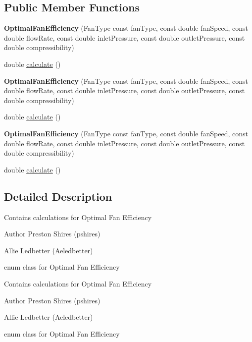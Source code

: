 \subsection*{Public Member Functions}
\begin{DoxyCompactItemize}
\item 
\mbox{\label{class_optimal_fan_efficiency_aff5850e4b0f6831e6d14436c138a723d}} 
{\bfseries Optimal\+Fan\+Efficiency} (Fan\+Type const fan\+Type, const double fan\+Speed, const double flow\+Rate, const double inlet\+Pressure, const double outlet\+Pressure, const double compressibility)
\item 
double \hyperlink{class_optimal_fan_efficiency_ac35291d1095c74373393ac510e45ae02}{calculate} ()
\item 
\mbox{\label{class_optimal_fan_efficiency_aff5850e4b0f6831e6d14436c138a723d}} 
{\bfseries Optimal\+Fan\+Efficiency} (Fan\+Type const fan\+Type, const double fan\+Speed, const double flow\+Rate, const double inlet\+Pressure, const double outlet\+Pressure, const double compressibility)
\item 
double \hyperlink{class_optimal_fan_efficiency_ac35291d1095c74373393ac510e45ae02}{calculate} ()
\item 
\mbox{\label{class_optimal_fan_efficiency_aff5850e4b0f6831e6d14436c138a723d}} 
{\bfseries Optimal\+Fan\+Efficiency} (Fan\+Type const fan\+Type, const double fan\+Speed, const double flow\+Rate, const double inlet\+Pressure, const double outlet\+Pressure, const double compressibility)
\item 
double \hyperlink{class_optimal_fan_efficiency_ac35291d1095c74373393ac510e45ae02}{calculate} ()
\end{DoxyCompactItemize}


\subsection{Detailed Description}
Contains calculations for Optimal Fan Efficiency \begin{DoxyAuthor}{Author}
Preston Shires (pshires) 

Allie Ledbetter (Aeledbetter) 
\end{DoxyAuthor}
enum class for Optimal Fan Efficiency

Contains calculations for Optimal Fan Efficiency \begin{DoxyAuthor}{Author}
Preston Shires (pshires) 

Allie Ledbetter (Aeledbetter) 
\end{DoxyAuthor}
enum class for Optimal Fan Efficiency

